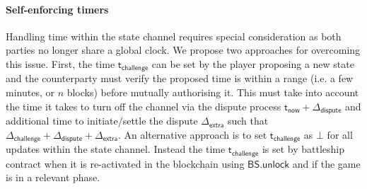 \documentclass{llncs}
\newcommand{\battleshipunlock}{\mathsf{BS.unlock}}
\newcommand{\timerchallenge}{\mathsf{\Delta}_{\mathsf{challenge}}}
\newcommand{\timechallenge}{\mathsf{t}_{\mathsf{challenge}}}
\newcommand{\timerextra}{\mathsf{\Delta}_{\mathsf{extra}}}
\newcommand{\timerdispute}{\mathsf{\Delta}_{\mathsf{dispute}}}
\newcommand{\timenow}{\mathsf{t}_{\mathsf{now}}}
\newcommand{\timedispute}{\timenow + \mathsf{\Delta}_{\mathsf{dispute}}}
\begin{document}


\paragraph{Self-enforcing  timers} 
Handling time within the state channel requires special consideration as both parties no longer share a global clock.
We propose two approaches for overcoming this issue. 
First, the time $\timechallenge$ can be set by the player proposing a new state and the counterparty must verify the proposed time is within a range (i.e. a few minutes, or $n$ blocks) before mutually authorising it.
This must take into account the time it takes to turn off the channel via the dispute process  $\timedispute$ and additional time to initiate/settle the dispute $\timerextra$ such that $\timerchallenge + \timerdispute + \timerextra$. 
An alternative approach is to set $\timechallenge$ as $\bot$ for all updates within the state channel. 
Instead the time $\timechallenge$ is set by battleship contract when it is re-activated in the blockchain using $\battleshipunlock$ and if the game is in a relevant phase.
\end{document}
